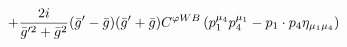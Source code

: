 %
\begin{dmath*}
%
  +  \frac{2 i}{{\bar g}^{\prime 2} + {\bar g}{}^2}({\bar g}^\prime - {\bar g}{}) ({\bar g}^\prime + {\bar g}{}) C^{ \varphi  WB} \left(p_1^{\mu_4} p_4^{\mu_1} - p_{1}\nobreak\cdot\nobreak{}p_{4} \eta_{\mu_1 \mu_4}\right)
%
\end{dmath*}
%
